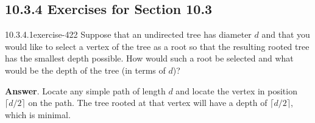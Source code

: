 \documentclass[twoside,10pt,]{book}
\numberwithin{equation}{section}
\begin{document}
\subsection*{10.3.4 Exercises for Section 10.3}
\begin{divisionsolution}{10.3.4.1}{}{exercise-422}%
\hypertarget{p-3646}{}%
Suppose that an undirected tree has diameter \(d\) and that you would like to select a vertex of the tree as a root so that the resulting rooted tree has the smallest depth possible. How would such a root be selected and what would be the depth of the tree (in terms of \(d\))?%
\par\smallskip%
\noindent\textbf{Answer}.\quad%
\hypertarget{p-3647}{}%
Locate any simple path of length \(d\) and locate the vertex in position \(\lceil d/2\rceil\) on the path. The tree rooted at that vertex will have a depth of \(\lceil d/2\rceil\), which is minimal.%
\end{divisionsolution}%
\end{document}
